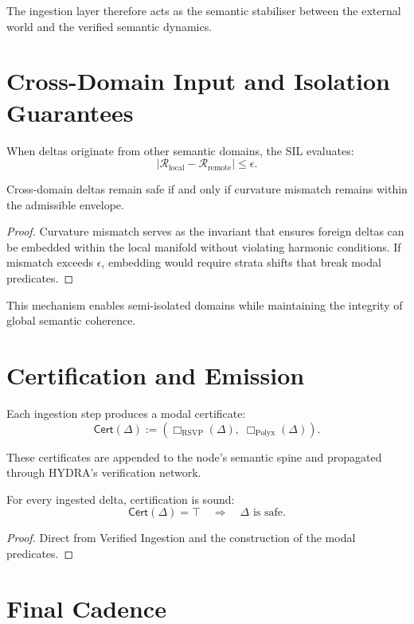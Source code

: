 The ingestion layer therefore acts as the semantic stabiliser between the 
external world and the verified semantic dynamics.

\section{Cross-Domain Input and Isolation Guarantees}

When deltas originate from other semantic domains, the SIL evaluates:
\[
|\mathcal{R}_{\mathrm{local}} - \mathcal{R}_{\mathrm{remote}}|
\le \epsilon.
\]

\begin{theorem}
Cross-domain deltas remain safe if and only if curvature mismatch 
remains within the admissible envelope.
\end{theorem}

\begin{proof}
Curvature mismatch serves as the invariant that ensures foreign deltas can be 
embedded within the local manifold without violating harmonic conditions.  
If mismatch exceeds $\epsilon$, embedding would require strata shifts that 
break modal predicates.
\end{proof}

This mechanism enables semi-isolated domains while maintaining 
the integrity of global semantic coherence.

\section{Certification and Emission}

Each ingestion step produces a modal certificate:
\[
\mathsf{Cert}(\Delta)
  := (\Box_{\mathrm{RSVP}}(\Delta),\;\Box_{\mathrm{Polyx}}(\Delta)).
\]

These certificates are appended to the node’s semantic spine and propagated 
through HYDRA’s verification network.

\begin{theorem}
For every ingested delta, certification is sound:
\[
\mathsf{Cert}(\Delta) = \top
\quad\Longrightarrow\quad
\Delta \text{ is safe}.
\]
\end{theorem}

\begin{proof}
Direct from Verified Ingestion and the construction of the modal predicates.
\end{proof}

\section{Final Cadence}

